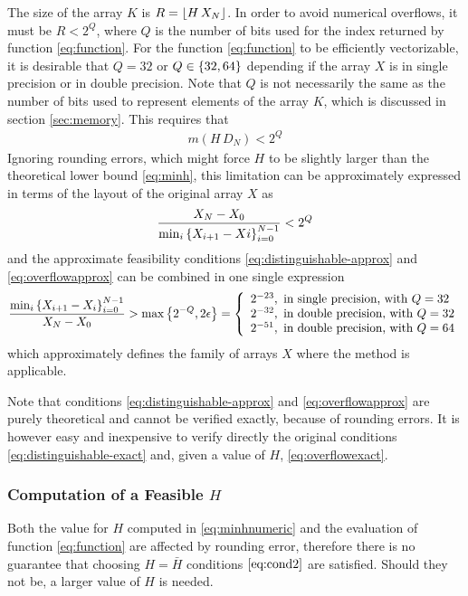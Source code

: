 \documentclass[preprint,1p,times]{elsarticle}
\begin{document}
The size of the array $K$ is $R=\left \lfloor H\, X_N \right \rfloor$. In order to avoid numerical overflows, it must be $R < 2^{Q}$, where $Q$ is the number of bits used for the index returned by function \eqref{eq:function}. For the function \eqref{eq:function} to be efficiently vectorizable, it is desirable that $Q=32$ or $Q\in\left \{ 32,64 \right \}$ depending if the array $X$ is in single precision or in double precision. Note that $Q$ is not necessarily the same as the number of bits used to represent elements of the array $K$, which is discussed in section \ref{sec:memory}. This requires that
\begin{align}
\label{eq:overflowexact}
m(H\, D_N) < 2^Q
\end{align}
Ignoring rounding errors, which might force $H$ to be slightly larger than the theoretical lower bound \eqref{eq:minh}, this limitation can be approximately expressed in terms of the layout of the original array $X$ as
\begin{align}
\label{eq:overflowapprox}
\frac{X_N-X_0}{\min_i\left \{ X_{i+1}-Xi \right \}_{i=0}^{N-1}}< 2^Q
\end{align}
and the approximate feasibility conditions \eqref{eq:distinguishable-approx} and \eqref{eq:overflowapprox} can be combined in one single expression
\begin{equation}
\label{eq:feasibility}
\frac{\min_i\left \{ X_{i+1}-X_i \right \}_{i=0}^{N-1}}{X_N-X_0} 
    > \max \left \{ 2^{-Q}, 2\epsilon \right \} 
    = \left\{ \begin{array}{l}
 	   2^{-23},\text{   in single precision, with }Q=32 \\
   	   2^{-32},\text{   in double precision, with }Q=32 \\
   	   2^{-51},\text{   in double precision, with }Q=64
    \end{array}\right.
\end{equation}
which approximately defines the family of arrays $X$ where the method is applicable.

Note that conditions \eqref{eq:distinguishable-approx} and \eqref{eq:overflowapprox} are purely theoretical and cannot be verified exactly, because of rounding errors.
It is however easy and inexpensive to verify directly the original conditions \eqref{eq:distinguishable-exact} and, given a value of $H$, \eqref{eq:overflowexact}.

\subsubsection{Computation of a Feasible $H$}
Both the value for $H$ computed in \eqref{eq:minhnumeric} and the evaluation of function \eqref{eq:function} are affected by rounding error, therefore there is no guarantee that choosing $H=\bar{H}$ conditions $\eqref{eq:cond2}$ are satisfied. Should they not be, a larger value of $H$ is needed.
\end{document}
